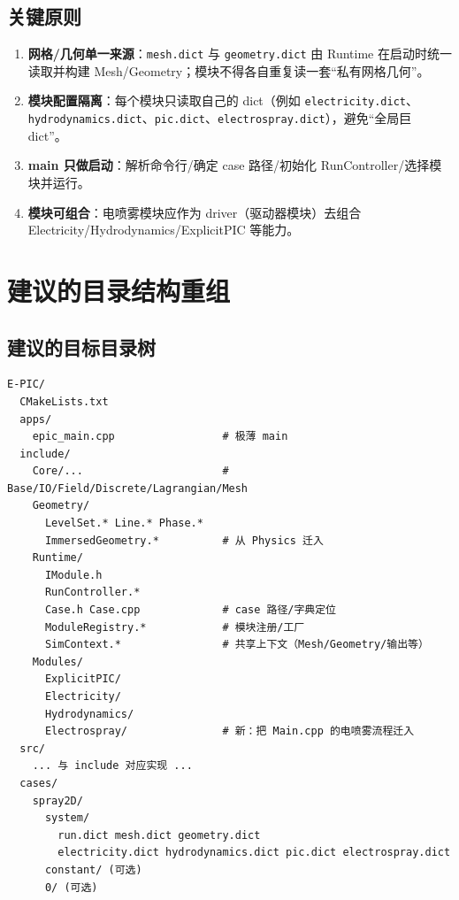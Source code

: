 \documentclass[UTF8,a4paper,11pt]{ctexart}
\begin{document}
\subsection{关键原则}
\begin{enumerate}[label=\arabic*)]
  \item \textbf{网格/几何单一来源}：\texttt{mesh.dict} 与 \texttt{geometry.dict} 由 Runtime 在启动时统一读取并构建 Mesh/Geometry；模块不得各自重复读一套“私有网格几何”。
  \item \textbf{模块配置隔离}：每个模块只读取自己的 dict（例如 \texttt{electricity.dict}、\texttt{hydrodynamics.dict}、\texttt{pic.dict}、\texttt{electrospray.dict}），避免“全局巨 dict”。
  \item \textbf{main 只做启动}：解析命令行/确定 case 路径/初始化 RunController/选择模块并运行。
  \item \textbf{模块可组合}：电喷雾模块应作为 driver（驱动器模块）去组合 Electricity/Hydrodynamics/ExplicitPIC 等能力。
\end{enumerate}

\section{建议的目录结构重组}

\subsection{建议的目标目录树}
\begin{lstlisting}
E-PIC/
  CMakeLists.txt
  apps/
    epic_main.cpp                 # 极薄 main
  include/
    Core/...                      # Base/IO/Field/Discrete/Lagrangian/Mesh
    Geometry/
      LevelSet.* Line.* Phase.*
      ImmersedGeometry.*          # 从 Physics 迁入
    Runtime/
      IModule.h
      RunController.*
      Case.h Case.cpp             # case 路径/字典定位
      ModuleRegistry.*            # 模块注册/工厂
      SimContext.*                # 共享上下文（Mesh/Geometry/输出等）
    Modules/
      ExplicitPIC/
      Electricity/
      Hydrodynamics/
      Electrospray/               # 新：把 Main.cpp 的电喷雾流程迁入
  src/
    ... 与 include 对应实现 ...
  cases/
    spray2D/
      system/
        run.dict mesh.dict geometry.dict
        electricity.dict hydrodynamics.dict pic.dict electrospray.dict
      constant/ (可选)
      0/ (可选)
\end{lstlisting}
\end{document}
